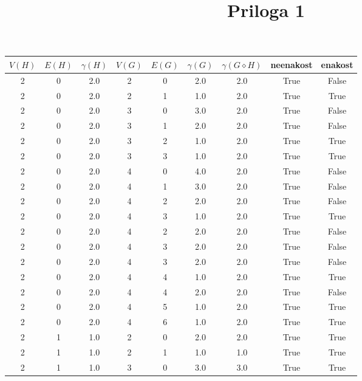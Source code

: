 \documentclass[a4paper,12pt]{article}
\begin{document}
\title{Priloga 1}

\maketitle

\begin{center}
    \begin{tabular}{ c c c | c c c | c | c | c}
        $V(H)$ & $E(H)$ & $\gamma(H)$ & $V(G)$ & $E(G)$ & $\gamma(G)$ & $\gamma(G \diamond H)$ & neenakost & enakost \\
        \hline
        2 & 0 & 2.0 & 2 & 0 & 2.0 & 2.0 & True & False \\
        2 & 0 & 2.0 & 2 & 1 & 1.0 & 2.0 & True & True     \\
        2 & 0 & 2.0 & 3 & 0 & 3.0 & 2.0 & True & False    \\
        2 & 0 & 2.0 & 3 & 1 & 2.0 & 2.0 & True & False    \\
        2 & 0 & 2.0 & 3 & 2 & 1.0 & 2.0 & True & True     \\
        2 & 0 & 2.0 & 3 & 3 & 1.0 & 2.0 & True & True     \\
        2 & 0 & 2.0 & 4 & 0 & 4.0 & 2.0 & True & False    \\
        2 & 0 & 2.0 & 4 & 1 & 3.0 & 2.0 & True & False    \\
        2 & 0 & 2.0 & 4 & 2 & 2.0 & 2.0 & True & False    \\
        2 & 0 & 2.0 & 4 & 3 & 1.0 & 2.0 & True & True     \\
        2 & 0 & 2.0 & 4 & 2 & 2.0 & 2.0 & True & False    \\
        2 & 0 & 2.0 & 4 & 3 & 2.0 & 2.0 & True & False    \\
        2 & 0 & 2.0 & 4 & 3 & 2.0 & 2.0 & True & False    \\
        2 & 0 & 2.0 & 4 & 4 & 1.0 & 2.0 & True & True     \\
        2 & 0 & 2.0 & 4 & 4 & 2.0 & 2.0 & True & False    \\
        2 & 0 & 2.0 & 4 & 5 & 1.0 & 2.0 & True & True     \\
        2 & 0 & 2.0 & 4 & 6 & 1.0 & 2.0 & True & True     \\
        2 & 1 & 1.0 & 2 & 0 & 2.0 & 2.0 & True & True     \\
        2 & 1 & 1.0 & 2 & 1 & 1.0 & 1.0 & True & True     \\
        2 & 1 & 1.0 & 3 & 0 & 3.0 & 3.0 & True & True     \\

\end{tabular}
\end{center}
\end{document}
